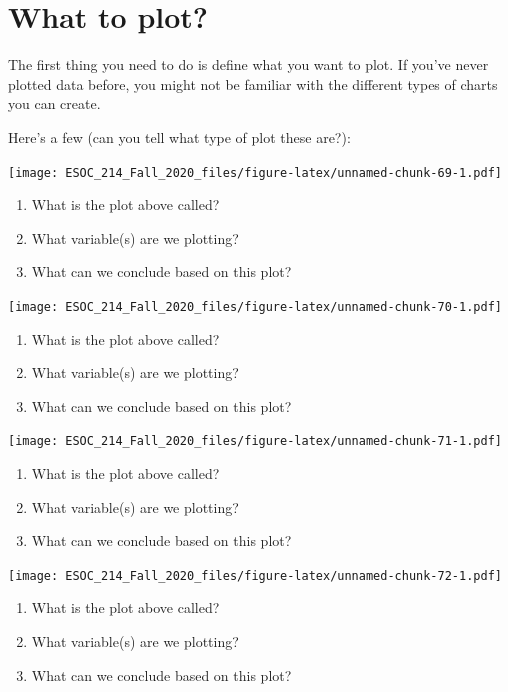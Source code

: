\documentclass[
]{book}
\begin{document}
\hypertarget{what-to-plot}{%
\section{What to plot?}\label{what-to-plot}}

The first thing you need to do is define what you want to plot. If you've never plotted data before, you might not be familiar with the different types of charts you can create.

Here's a few (can you tell what type of plot these are?):

\texttt{[image: ESOC\_214\_Fall\_2020\_files/figure-latex/unnamed-chunk-69-1.pdf]}

\begin{enumerate}
\def\labelenumi{\arabic{enumi})}
\item
  What is the plot above called?
\item
  What variable(s) are we plotting?
\item
  What can we conclude based on this plot?
\end{enumerate}

\texttt{[image: ESOC\_214\_Fall\_2020\_files/figure-latex/unnamed-chunk-70-1.pdf]}

\begin{enumerate}
\def\labelenumi{\arabic{enumi})}
\item
  What is the plot above called?
\item
  What variable(s) are we plotting?
\item
  What can we conclude based on this plot?
\end{enumerate}

\texttt{[image: ESOC\_214\_Fall\_2020\_files/figure-latex/unnamed-chunk-71-1.pdf]}

\begin{enumerate}
\def\labelenumi{\arabic{enumi})}
\item
  What is the plot above called?
\item
  What variable(s) are we plotting?
\item
  What can we conclude based on this plot?
\end{enumerate}

\texttt{[image: ESOC\_214\_Fall\_2020\_files/figure-latex/unnamed-chunk-72-1.pdf]}

\begin{enumerate}
\def\labelenumi{\arabic{enumi})}
\item
  What is the plot above called?
\item
  What variable(s) are we plotting?
\item
  What can we conclude based on this plot?
\end{enumerate}
\end{document}
